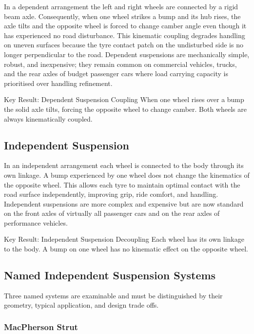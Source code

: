 \documentclass[10pt,a4paper]{article}
\begin{document}
In a dependent arrangement the left and right wheels are connected by a rigid beam axle. Consequently, when one wheel strikes a bump and its hub rises, the axle tilts and the opposite wheel is forced to change camber angle even though it has experienced no road disturbance. This kinematic coupling degrades handling on uneven surfaces because the tyre contact patch on the undisturbed side is no longer perpendicular to the road. Dependent suspensions are mechanically simple, robust, and inexpensive; they remain common on commercial vehicles, trucks, and the rear axles of budget passenger cars where load carrying capacity is prioritised over handling refinement.

\begin{keybox}{Key Result: Dependent Suspension Coupling}
When one wheel rises over a bump the solid axle tilts, forcing the opposite wheel to change camber. Both wheels are always kinematically coupled.
\end{keybox}

\subsection{Independent Suspension}

In an independent arrangement each wheel is connected to the body through its own linkage. A bump experienced by one wheel does not change the kinematics of the opposite wheel. This allows each tyre to maintain optimal contact with the road surface independently, improving grip, ride comfort, and handling. Independent suspensions are more complex and expensive but are now standard on the front axles of virtually all passenger cars and on the rear axles of performance vehicles.

\begin{keybox}{Key Result: Independent Suspension Decoupling}
Each wheel has its own linkage to the body. A bump on one wheel has no kinematic effect on the opposite wheel.
\end{keybox}

\subsection{Named Independent Suspension Systems}

Three named systems are examinable and must be distinguished by their geometry, typical application, and design trade offs.

\subsubsection{MacPherson Strut}
\end{document}
